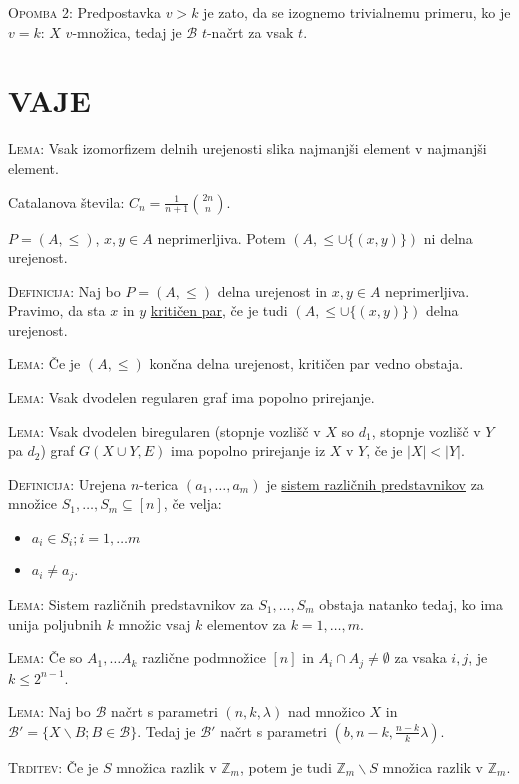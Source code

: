 \documentclass[8pt,a4paper]{amsart}
\theoremstyle{definition} %
\theoremstyle{plain} %
\newcommand{\Z}{\mathbb Z}
\begin{document}
\textsc{Opomba 2:} Predpostavka $v > k $ je zato, da se izognemo trivialnemu primeru, ko je $v = k$: $X$ $v$-množica, tedaj je $\mathcal{B}$ $t$-načrt za vsak $t$.

\section{VAJE}

\textsc{Lema:} Vsak izomorfizem delnih urejenosti slika najmanjši element v najmanjši element.

Catalanova števila: $C_n = \frac{1}{n+1}\binom{2n}{n}$.

$P=(A,\leq)$, $x,y \in A$ neprimerljiva. Potem $(A,\leq \cup \{ (x,y) \} )$ ni delna urejenost.

\textsc{Definicija:} Naj bo $P=(A,\leq)$ delna urejenost in $x,y \in A$ neprimerljiva. Pravimo, da sta $x$ in $y$ \underline{kritičen par}, če je tudi $(A,\leq \cup \{ (x,y)\} )$ delna urejenost.

\textsc{Lema:} Če je $(A, \leq )$ končna delna urejenost, kritičen par vedno obstaja.

\textsc{Lema:} Vsak dvodelen regularen graf ima popolno prirejanje.

\textsc{Lema:} Vsak dvodelen biregularen (stopnje vozlišč v $X$ so $d_1$, stopnje vozlišč v $Y$ pa $d_2$) graf $G(X \cup Y,E)$ ima popolno prirejanje iz $X$ v $Y$, če je $|X| < |Y|$.

\textsc{Definicija:} Urejena $n$-terica $(a_1,\ldots ,a_m)$ je \underline{sistem različnih predstavnikov} za množice $S_1,\ldots ,S_m \subseteq [n]$, če velja:
\begin{itemize}
\item $a_i \in S_i; i=1,\ldots m$
\item $a_i \neq a_j$.
\end{itemize}

\textsc{Lema:} Sistem različnih predstavnikov za $S_1,\ldots ,S_m$ obstaja natanko tedaj, ko ima unija poljubnih $k$ množic vsaj $k$ elementov za $k = 1,\ldots , m$.

\textsc{Lema:} Če so $A_1, \ldots A_k$ različne podmnožice $[n]$ in $A_i \cap A_j \neq \emptyset$ za vsaka $i,j$, je $k \leq 2^{n-1}$.

\textsc{Lema:} Naj bo $\mathcal{B}$ načrt s parametri $(n,k,\lambda)$ nad množico $X$ in $\mathcal{B}' = \{ X \backslash B ; B \in \mathcal{B} \}$. Tedaj je $\mathcal{B}'$ načrt s parametri $(b,n-k,\frac{n-k}{k}\lambda)$.

\textsc{Trditev:} Če je $S$ množica razlik v $\Z_m$, potem je tudi $\Z_m \backslash S$ množica razlik v $\Z_m$.
\end{document}
